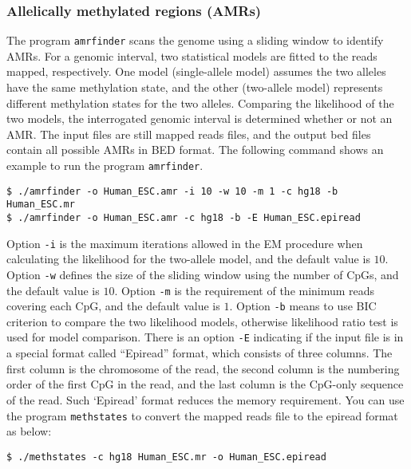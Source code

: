 \documentclass[10pt]{article}
\newcommand{\prog}[1]{\texttt{#1}}
\newcommand{\op}[1]{\texttt{#1}}
\begin{document}
\subsubsection{Allelically methylated regions (AMRs)}
The program \prog{amrfinder} scans the genome using a sliding window
to identify AMRs. For a genomic interval, two statistical models are
fitted to the reads mapped, respectively. One model (single-allele
model) assumes the two alleles have the same methylation state, and
the other (two-allele model) represents different methylation states
for the two alleles. Comparing the likelihood of the two models, the
interrogated genomic interval is determined whether or not an AMR. The
input files are still mapped reads files, and the output bed files
contain all possible AMRs in BED format. The following command shows
an example to run the program \prog{amrfinder}.
\begin{verbatim}
$ ./amrfinder -o Human_ESC.amr -i 10 -w 10 -m 1 -c hg18 -b Human_ESC.mr
$ ./amrfinder -o Human_ESC.amr -c hg18 -b -E Human_ESC.epiread
\end{verbatim}
Option \op{-i} is the maximum iterations allowed in the EM procedure
when calculating the likelihood for the two-allele model, and the
default value is $10$. Option \op{-w} defines the size of the sliding
window using the number of CpGs, and the default value is $10$. Option
\op{-m} is the requirement of the minimum reads covering each CpG, and
the default value is $1$. Option \op{-b} means to use BIC criterion to
compare the two likelihood models, otherwise likelihood ratio test is
used for model comparison. There is an option \op{-E} indicating if
the input file is in a special format called ``Epiread'' format, which
consists of three columns. The first column is the chromosome of the
read, the second column is the numbering order of the first CpG in the
read, and the last column is the CpG-only sequence of the read. Such
`Epiread' format reduces the memory requirement. You can use the
program \prog{methstates} to convert the mapped reads file to the
epiread format as below:
\begin{verbatim}
$ ./methstates -c hg18 Human_ESC.mr -o Human_ESC.epiread
\end{verbatim}



\end{document}
